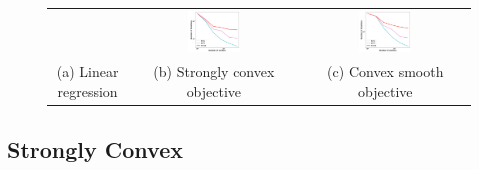 \begin{figure}
\begin{tabular}{ccc}
&
\includegraphics[width=0.33\textwidth]{fig/paper-stronglycvxsmthspeedupNodesT-min-w8a-epsilon0131-reg1e-05.pdf} &
\includegraphics[width=0.33\textwidth]{fig/paper-cvxsmoothspeedupNodesT-min-w8a-epsilon0134-reg0.pdf} \\
(a) Linear regression  & (b) Strongly convex objective & (c) Convex smooth objective
	\end{tabular}

\end{figure}

\subsection{Strongly Convex}

